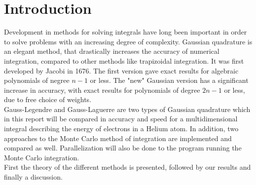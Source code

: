 \documentclass[../main.tex]{subfiles}
\begin{document}
\section{Introduction} \label{sec:intro}
Development in methods for solving integrals have long been important in order to solve problems with an increasing degree of complexity. Gaussian quadrature is an elegant method, that drastically increases the accuracy of numerical integration, compared to other methods like trapizoidal integration. It was first developed by Jacobi in 1676. The first version gave exact results for algebraic polynomials of negree $n-1$ or less. The "new" Gaussian version has a significant increase in accuracy, with exact results for polynomials of degree $2n-1$ or less, due to free choice of weights. \cite{Milovanovic2016}\\
Gauss-Legendre and Gauss-Laguerre are two types of Gaussian quadrature which in this report will be compared in accuracy and speed for a multidimensional integral describing the energy of electrons in a Helium atom. In addition, two approaches to the Monte Carlo method of integration are implemented and compared as well. Parallelization will also be done to the program running the Monte Carlo integration.\\
First the theory of the different methods is presented, followed by our results and finally a discussion.
\end{document}
